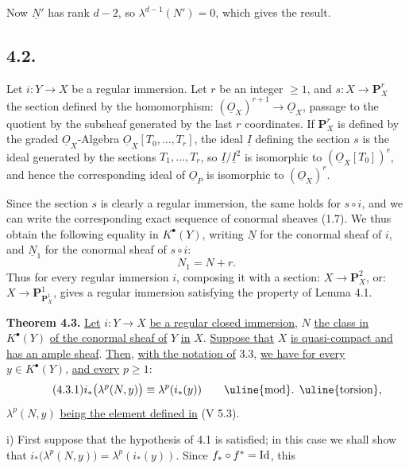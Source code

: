 %
Now \(\underline{N}'\) has rank \(d-2\), so \(\lambda^{d-1}(N')=0\), which gives the result.

\subsection*{4.2.}

Let \(i:Y\to X\) be a regular immersion. Let \(r\) be an integer \(\ge1\), and \(s:X\longrightarrow \mathbf P_X^r\) the section defined by the homomorphism: \((\underline{O}_X)^{r+1}\to\underline{O}_X\), passage to the quotient by the subsheaf generated by the last \(r\) coordinates. If \(\mathbf P_X^r\) is defined by the graded \(\underline{O}_X\)-Algebra \(\underline{O}_X[T_0,\ldots,T_r]\), the ideal \(\underline{I}\) defining the section \(s\) is the ideal generated by the sections \(T_1,\ldots,T_r\), so \(\underline{I}/\underline{I}^2\) is isomorphic to \((\underline{O}_X[T_0])^r\), and hence the corresponding ideal of \(\underline{O}_P\) is isomorphic to \((\underline{O}_X)^r\).

Since the section \(s\) is clearly a regular immersion, the same holds for \(s\circ i\), and we can write the corresponding exact sequence of conormal sheaves (1.7). We thus obtain the following equality in \(K^{\bullet}(Y)\), writing \(\underline{N}\) for the conormal sheaf of \(i\), and \(\underline{N}_1\) for the conormal sheaf of \(s\circ i\):
\[
  N_1=N+r.
\]
Thus for every regular immersion \(i\), composing it with a section: \(X\to\mathbf P_X^2\), or: \(X\to\mathbf P_{\mathbf P_X^1}^{1}\), gives a regular immersion satisfying the property of Lemma 4.1.

\textbf{Theorem 4.3.} \uline{Let} \(i:Y\to X\) \uline{be a regular closed immersion}, \(N\) \uline{the class in} \(K^{\bullet}(Y)\) \uline{of the conormal sheaf of} \(Y\) \uline{in} \(X\). \uline{Suppose that} \(X\) \uline{is quasi-compact and has an ample sheaf}. \uline{Then}, \uline{with the notation of} 3.3, \uline{we have for every} \(y\in K^{\bullet}(Y)\), \uline{and every} \(p\ge1\):
\begin{equation}\tag{4.3.1}
 i_*\bigl(\lambda^p(N,y)\bigr)\equiv \lambda^p(i_*(y))
 \qquad\text{\uline{mod}. \uline{torsion}},
\end{equation}
\(\lambda^p(N,y)\) \uline{being the element defined in} (V 5.3).

i) First suppose that the hypothesis of 4.1 is satisfied; in this case we shall show that \(i_*\bigl(\lambda^p(N,y)\bigr)=\lambda^p(i_*(y))\). Since \(f_*\circ f^*=\operatorname{Id}\), this


